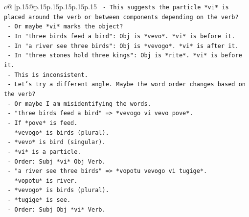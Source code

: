 \documentclass{article}
\begin{document}
{\begin{supertabular}{c@{$\;$}|p{.15\linewidth}@{}p{.15\linewidth}p{.15\linewidth}p{.15\linewidth}p{.15\linewidth}p{.15\linewidth}}
{{{\texttt{                                         {-} This suggests the particle *vi* is placed around the verb or between components depending on the verb?} \\
\texttt{                                         {-} Or maybe *vi* marks the object?} \\
\texttt{                                           {-} In "three birds feed a bird": Obj is *vevo*. *vi* is before it.} \\
\texttt{                                           {-} In "a river see three birds": Obj is *vevogo*. *vi* is after it.} \\
\texttt{                                           {-} In "three stones hold three kings": Obj is *rite*. *vi* is before it.} \\
\texttt{                                         {-} This is inconsistent.} \\
\texttt{                                         {-} Let's try a different angle. Maybe the word order changes based on the verb?} \\
\texttt{                                         {-} Or maybe I am misidentifying the words.} \\
\texttt{                                         {-} "three birds feed a bird" => *vevogo vi vevo pove*.} \\
\texttt{                                           {-} If *pove* is feed.} \\
\texttt{                                           {-} *vevogo* is birds (plural).} \\
\texttt{                                           {-} *vevo* is bird (singular).} \\
\texttt{                                           {-} *vi* is a particle.} \\
\texttt{                                           {-} Order: Subj *vi* Obj Verb.} \\
\texttt{                                         {-} "a river see three birds" => *vopotu vevogo vi tugige*.} \\
\texttt{                                           {-} *vopotu* is river.} \\
\texttt{                                           {-} *vevogo* is birds (plural).} \\
\texttt{                                           {-} *tugige* is see.} \\
\texttt{                                           {-} Order: Subj Obj *vi* Verb.} \\
}}}
\end{supertabular}}
\end{document}

